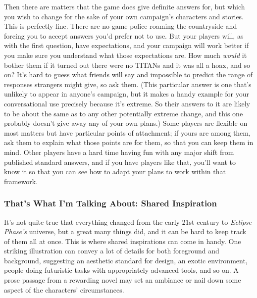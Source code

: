 Then there are matters that the game does give 
definite answers for, but which you wish to change 
for the sake of your own campaign's characters and 
stories. This is perfectly fine. There are no game police 
roaming the countryside and forcing you to accept 
answers you'd prefer not to use. But your players 
will, as with the first question, have expectations, and 
your campaign will work better if you make sure you 
understand what those expectations are. How much 
\textit{would }it bother them if it turned out there were no 
TITANs and it was all a hoax, and so on? It's hard to 
guess what friends will say and impossible to predict 
the range of responses strangers might give, so ask 
them. (This particular answer is one that's unlikely to 
appear in anyone's campaign, but it makes a handy 
example for your conversational use precisely because 
it's extreme. So their answers to it are likely to be 
about the same as to any other potentially extreme 
change, and this one probably doesn't give away any 
of your own plans.) Some players are flexible on most 
matters but have particular points of attachment; 
if yours are among them, ask them to explain what 
those points are for them, so that you can keep them 
in mind. Other players have a hard time having fun 
with any major shift from published standard answers, 
and if you have players like that, you'll want to know 
it so that you can see how to adapt your plans to 
work within that framework. 

\subsubsection{That's What I'm Talking About: Shared Inspiration }

It's not quite true that everything changed from the 
early 21st century to \textit{Eclipse Phase's} universe, but a 
great many things did, and it can be hard to keep track 
of them all at once. This is where shared inspirations 
can come in handy. One striking illustration can convey 
a lot of details for both foreground and background, 
suggesting an aesthetic standard for design, an exotic 
environment, people doing futuristic tasks with appropriately
advanced tools, and so on. A prose passage
from a rewarding novel may set an ambiance or nail 
down some aspect of the characters' circumstances. 

